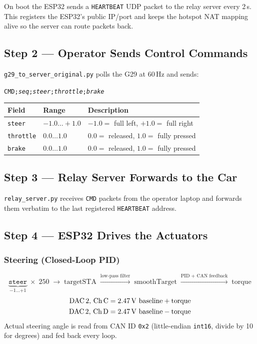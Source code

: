 ﻿\documentclass[12pt, letterpaper]{article}
\begin{document}
On boot the ESP32 sends a \texttt{HEARTBEAT} UDP packet to the relay server every
2\,s.  This registers the ESP32's public IP/port and keeps the hotspot NAT mapping
alive so the server can route packets back.

\subsection{Step 2 --- Operator Sends Control Commands}

\texttt{g29\_to\_server\_original.py} polls the G29 at 60\,Hz and sends:
\begin{center}\texttt{CMD;\textit{seq};\textit{steer};\textit{throttle};\textit{brake}}\end{center}

\begin{center}
\begin{tabular}{lll}
  \toprule
  \textbf{Field} & \textbf{Range} & \textbf{Description}\\
  \midrule
  \texttt{steer}    & $-1.0\ldots+1.0$ & $-1.0=$ full left, $+1.0=$ full right\\
  \texttt{throttle} & $0.0\ldots1.0$   & $0.0=$ released, $1.0=$ fully pressed\\
  \texttt{brake}    & $0.0\ldots1.0$   & $0.0=$ released, $1.0=$ fully pressed\\
  \bottomrule
\end{tabular}
\end{center}

\subsection{Step 3 --- Relay Server Forwards to the Car}

\texttt{relay\_server.py} receives \texttt{CMD} packets from the operator laptop and
forwards them verbatim to the last registered \texttt{HEARTBEAT} address.

\subsection{Step 4 --- ESP32 Drives the Actuators}

\subsubsection*{Steering (Closed-Loop PID)}

\[
  \underbrace{\texttt{steer}}_{{-1}\ldots{+1}}
  \;\times\; 250
  \;\longrightarrow\;
  \text{targetSTA}
  \;\xrightarrow{\text{low-pass filter}}\;
  \text{smoothTarget}
  \;\xrightarrow{\text{PID + CAN feedback}}\;
  \text{torque}
\]
\begin{align*}
  \text{DAC\,2, Ch\,C} &= 2.47\,\text{V baseline} + \text{torque}\\
  \text{DAC\,2, Ch\,D} &= 2.47\,\text{V baseline} - \text{torque}
\end{align*}
Actual steering angle is read from CAN ID \texttt{0x2} (little-endian \texttt{int16},
divide by 10 for degrees) and fed back every loop.
\end{document}
